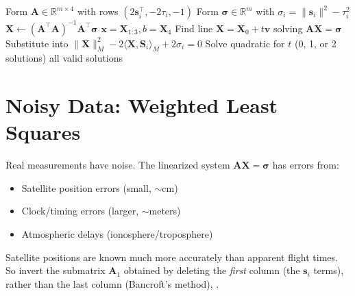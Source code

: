 \begin{algorithm}
\caption{GPS Solution (Exact Data)} \cite{boutin2025gps}
\label{alg:gps}
\begin{algorithmic}[1]
 \cite{boutin2025gps}
    \State Form $\bm{A} \in \mathbb{R}^{m \times 4}$ with rows $(2\bm{s}_i^\top, -2\tau_i, -1)$
    \State Form $\bm{\sigma} \in \mathbb{R}^m$ with $\sigma_i = \|\bm{s}_i\|^2 - \tau_i^2$
        \State $\bm{X} \gets (\bm{A}^\top \bm{A})^{-1} \bm{A}^\top \bm{\sigma}$  
        \State \Return $\bm{x} = \bm{X}_{1:3}, b = \bm{X}_4$
    \Else {}
        \State Find line $\bm{X} = \bm{X}_0 + t \bm{v}$ solving $\bm{A}\bm{X} = \bm{\sigma}$
        \State Substitute into $\|\bm{X}\|_M^2 - 2\langle \bm{X}, \bm{S}_i \rangle_M + 2\sigma_i = 0$
        \State Solve quadratic for $t$ (0, 1, or 2 solutions)
        \State \Return all valid solutions
    \EndIf
\EndProcedure
\end{algorithmic}
\end{algorithm}

\section{Noisy Data: Weighted Least Squares}
\label{sec:gps:noisy}

Real measurements have noise. The linearized system $\bm{A}\bm{X} = \bm{\sigma}$ has errors from:
\begin{itemize}
    \item Satellite position errors (small, $\sim$cm)
    \item Clock/timing errors (larger, $\sim$meters)
    \item Atmospheric delays (ionosphere/troposphere)
\end{itemize}

Satellite positions are known much more accurately than apparent flight times. So invert the submatrix $\bm{A}_1$ obtained by deleting the \emph{first} column (the $\bm{s}_i$ terms), rather than the last column (Bancroft's method), \cite{bancroft1985algebraic}.

